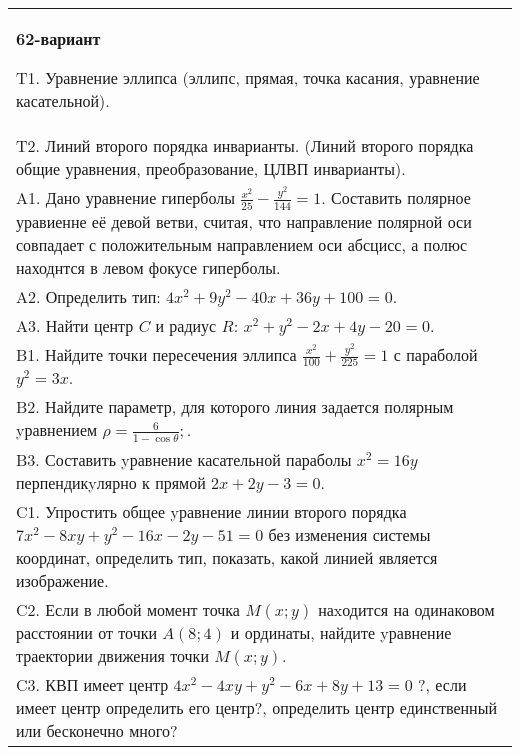 \documentclass{article}
\begin{document}
\begin{tabular}{m{17cm}}
\textbf{62-вариант}
\newline

T1. Уравнение эллипса (эллипс, прямая, точка касания, уравнение касательной).\\

T2. Линий второго порядка инварианты. (Линий второго порядка общие уравнения, преобразование, ЦЛВП инварианты).\\

A1. Дано уравнение гиперболы $\frac{x^{2}}{25}-\frac{y^{2}}{144}=1$. Составить полярное уравиенне её девой ветви, считая, что направление полярной оси совпадает с положительным направлением оси абсцисс, а полюс находнтся в левом фокусе гиперболы.\\

A2. Определить тип: $4x^2+9y^2-40x+36y+100=0$.\\

A3. Найти центр $C$ и радиус $R$: $x^2+y^2-2x+4y-20=0$.\\

B1. Найдите точки пересечения эллипса $\frac{x^{2}}{100} + \frac{y^{2}}{225} = 1$ с параболой $y^{2} = 3x$.\\

B2. Найдите параметр, для которого линия задается полярным yравнением $\rho = \frac{6}{1 - \cos \theta};$.  \\

B3. Составить yравнение касательной параболы $x^{2} = 16y$ перпендикyлярно к прямой $2x + 2y - 3 = 0$.  \\

C1. Упростить общее yравнение линии второго порядка $7x^{2}-8xy+y^{2}-16x-2y-51=0$ без изменения системы координат, определить тип, показать, какой линией является изображение.\\

C2. Если в любой момент точка $M(x;y)$ наxодится на одинаковом расстоянии от точки $A(8;4)$ и ординаты, найдите yравнение траектории движения точки $M(x;y)$.  \\

C3. КВП имеет центр $4x^{2}-4xy+y^{2}-6x+8y+13=0$ ?, если имеет центр определить его центр?, определить центр единственный или бесконечно много?  \\

\end{tabular}
\vspace{1cm}
\end{document}
